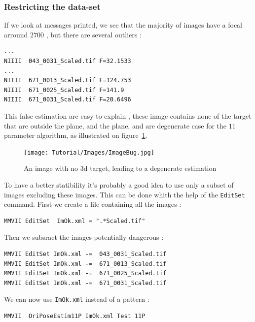 
\subsubsection{Restricting the data-set}

If we look at messages printed, we see that the majority
of images have a focal arround $2700$ , but there are several
outliers :

\begin{lstlisting}
...
NIIII  043_0031_Scaled.tif F=32.1533
...
NIIII  671_0013_Scaled.tif F=124.753
NIIII  671_0025_Scaled.tif F=141.9
NIIII  671_0031_Scaled.tif F=20.6496
\end{lstlisting}


This false estimation are easy to explain , these image contains none of the target that are outside
the plane, and the plane, and are degenerate case for the $11$ parameter algorithm,
as illustrated on figure~\ref{fig:CodeT:DegenCase}.

\begin{figure}
\centering
	\texttt{[image: Tutorial/Images/ImageBug.jpg]}
	\caption{An image with no 3d target, leading to a degenerate estimation}
\label{fig:CodeT:DegenCase}
\end{figure}

To have a better statibility it's probably a good idea to use only a subset of images
excluding these images. This can be done whith the help of the {\tt EditSet} command.  First
we create a file containing all the images :

\begin{lstlisting}
MMVII EditSet  ImOk.xml = ".*Scaled.tif"
\end{lstlisting}

Then we subsract the images potentially dangerous :

\begin{lstlisting}
MMVII EditSet ImOk.xml -=  043_0031_Scaled.tif
MMVII EditSet ImOk.xml -=  671_0013_Scaled.tif
MMVII EditSet ImOk.xml -=  671_0025_Scaled.tif
MMVII EditSet ImOk.xml -=  671_0031_Scaled.tif
\end{lstlisting}

We can now use {\tt ImOk.xml} instead of a pattern :

\begin{lstlisting}
MMVII  OriPoseEstim11P ImOk.xml Test 11P
\end{lstlisting}

